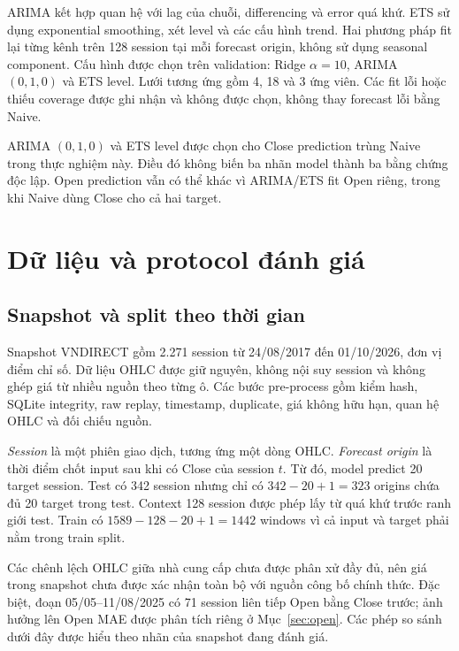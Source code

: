 \documentclass[11pt,a4paper]{article}
\begin{document}
ARIMA kết hợp quan hệ với lag của chuỗi, differencing và error quá khứ.
ETS sử dụng exponential smoothing, xét level và các cấu hình trend.
Hai phương pháp fit lại từng kênh trên 128 session tại mỗi forecast origin,
không sử dụng seasonal component. Cấu hình được chọn trên validation:
Ridge $\alpha=10$, ARIMA $(0,1,0)$ và ETS level. Lưới tương ứng gồm
4, 18 và 3 ứng viên. Các fit lỗi hoặc thiếu coverage được ghi nhận và
không được chọn, không thay forecast lỗi bằng Naive.

ARIMA $(0,1,0)$ và ETS level được chọn cho Close prediction trùng Naive
trong thực nghiệm này. Điều đó không biến ba nhãn model thành ba bằng
chứng độc lập. Open prediction vẫn có thể khác vì ARIMA/ETS fit Open
riêng, trong khi Naive dùng Close cho cả hai target.

\section{Dữ liệu và protocol đánh giá}
\subsection{Snapshot và split theo thời gian}
Snapshot VNDIRECT gồm 2.271 session từ 24/08/2017 đến 01/10/2026,
đơn vị điểm chỉ số. Dữ liệu OHLC được giữ nguyên, không nội suy session
và không ghép giá từ nhiều nguồn theo từng ô. Các bước pre-process
gồm kiểm hash, SQLite integrity, raw replay, timestamp, duplicate,
giá không hữu hạn, quan hệ OHLC và đối chiếu nguồn.

\begin{table}[htbp]
\centering\small
\caption{Ranh giới thời gian và số forecast origins hợp lệ.}
\label{tab:split}

\end{table}

\emph{Session} là một phiên giao dịch, tương ứng một dòng OHLC.
\emph{Forecast origin} là thời điểm chốt input sau khi có Close của
session $t$. Từ đó, model predict 20 target session. Test có 342 session
nhưng chỉ có $342-20+1=323$ origins chứa đủ 20 target trong test.
Context 128 session được phép lấy từ quá khứ trước ranh giới test.
Train có $1589-128-20+1=1442$ windows vì cả input và target phải nằm
trong train split.

Các chênh lệch OHLC giữa nhà cung cấp chưa được phân xử đầy đủ, nên giá
trong snapshot chưa được xác nhận toàn bộ với nguồn công bố chính thức.
Đặc biệt, đoạn 05/05--11/08/2025 có 71 session liên tiếp Open bằng
Close trước; ảnh hưởng lên Open MAE được phân tích riêng ở
Mục~\ref{sec:open}. Các phép so sánh dưới đây được hiểu theo nhãn của
snapshot đang đánh giá.
\end{document}
